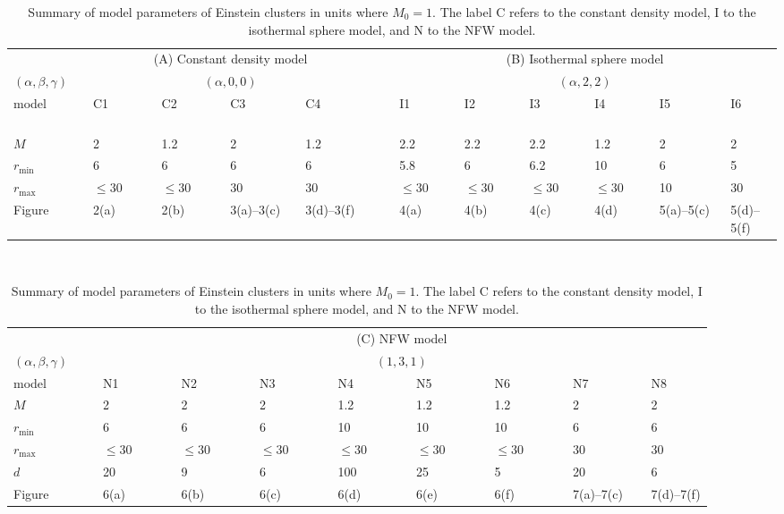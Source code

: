 \documentclass[aps,11pt,nofootinbib,preprintnumbers,groupedaddress,superscriptaddress]{revtex4-2}
\begin{document}
\begin{table}
\begin{tabular}{llllllllllll}
\hline
\hline
&\multicolumn{4}{c}{(A) Constant density model}&~
&\multicolumn{6}{c}{(B) Isothermal sphere model}
\\
$(\alpha, \beta, \gamma)$
&\multicolumn{4}{c}{$(\alpha, 0, 0)$}
&&\multicolumn{6}{c}{$(\alpha, 2, 2)$}
\\
\cline{2-5}
\cline{7-12}
model~~~~~~&C1~~~~~~~~&C2~~~~~~~~&C3~~~~~~~~~~&C4~~~~~~~~~~&
&I1~~~~~~~~&I2~~~~~~~~&I3~~~~~~~~&I4~~~~~~~~&I5~~~~~~~~~~&I6
\\
\cline{1-5}
\cline{7-12}
$M$
&2&1.2&2&1.2
&
&2.2&2.2&2.2&1.2
&2&2
\\
$r_{\mathrm{min}}$
&6&6&6&6
&
&5.8&6&6.2&10
&6&5
\\
$r_{\mathrm{max}}$
&$\le30$&$\le30$&30&30
&
&$\le30$&$\le30$&$\le30$&$\le30$
&10&30
\\
Figure&2(a)&2(b)&3(a)--3(c)&3(d)--3(f)
&
&4(a)&4(b)&4(c)&4(d)&5(a)--5(c)&5(d)--5(f)
\\
\hline
\hline
\end{tabular}
\\[1mm]
\begin{tabular}{lllllllll}
\hline
\hline
&\multicolumn{8}{c}{(C) NFW model}
\\
$(\alpha,\beta,\gamma)$&\multicolumn{8}{c}{$(1, 3, 1)$}
\\
\cline{2-9}
model~~~~~~~&N1~~~~~~~~&N2~~~~~~~~&N3~~~~~~~~&N4~~~~~~~~&N5~~~~~~~~&N6~~~~~~~~
&N7~~~~~~~~&N8
\\
\hline
$M$
&2&2&2&1.2&1.2&1.2
&2&2
\\
$r_{\mathrm{min}}$
&6&6&6&10&10&10
&6&6
\\
$r_{\mathrm{max}}$
&$\le30$&$\le30$&$\le30$&$\le30$&$\le30$&$\le30$
&30&30
\\
$d$
&20&9&6&100&25&5
&20&6
\\
Figure&6(a)&6(b)&6(c)&6(d)&6(e)&6(f)&7(a)--7(c)&7(d)--7(f)
\\
\hline
\hline
\end{tabular}
~~~~~~~~~~~~~~~~~~~~~~
%
\caption{Summary of model parameters of Einstein clusters in units where $M_0=1$.
The label C refers to the constant density model, I to the isothermal sphere model, and N to the NFW model.}
\label{table:modelsummary}
\end{table}




\end{document}
